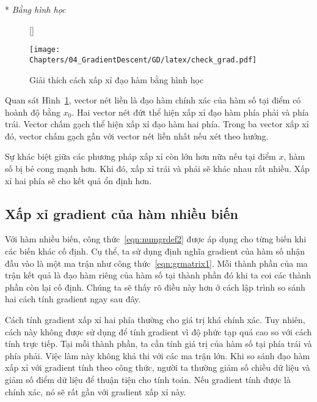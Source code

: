 \newpage
* \textit{Bằng hình học }

\begin{figure}[t]
[\FBwidth]
{\caption{
Giải thích cách xấp xỉ đạo hàm bằng hình học
}
\label{fig:explain_numgrad}}
{ %
\texttt{[image: Chapters/04\_GradientDescent/GD/latex/check\_grad.pdf]}
}
\end{figure}

Quan sát Hình~\ref{fig:explain_numgrad}, vector nét liền là đạo hàm {chính xác}
của hàm số tại điểm có hoành độ bằng $x_0$. Hai vector nét đứt thể hiện xấp xỉ
đạo hàm phía phải và phía trái. Vector chấm gạch thể hiện xấp xỉ đạo hàm hai
phía. Trong ba vector xấp xỉ đó, vector chấm gạch gần với vector nét liền nhất
nếu xét theo hướng.

Sự khác biệt giữa các phương pháp xấp xỉ còn lớn hơn nữa nếu tại điểm $x$, hàm số bị
{bẻ cong} mạnh hơn. Khi đó, xấp xỉ trái và phải sẽ khác nhau rất nhiều.
Xấp xỉ hai phía sẽ cho kết quả ổn định hơn.


\subsection{Xấp xỉ gradient của hàm nhiều biến}

Với hàm nhiều biến, công thức~\eqref{eqn:numgrdef2} được áp dụng cho từng biến
khi các biến khác cố định. Cụ thể, ta sử dụng định nghĩa gradient của hàm số nhận
đầu vào là một ma trận như công thức~\eqref{eqn:grmatrix1}. Mỗi thành phần của
ma trận kết quả là đạo hàm riêng của hàm số tại thành phần đó khi ta coi các thành
phần còn lại cố định. Chúng ta sẽ thấy rõ điều này hơn ở cách lập trình so sánh
hai cách tính gradient ngay sau đây.

Cách tính gradient xấp xỉ hai phía thường cho giá trị khá chính xác. Tuy nhiên,
cách này không được sử dụng để tính gradient vì độ phức tạp quá cao so với cách
tính trực tiếp. Tại mỗi thành phần, ta cần tính giá trị của hàm số tại phía trái
và phía phải. Việc làm này không khả thi với các ma trận lớn. Khi so sánh đạo
hàm xấp xỉ với gradient tính theo công thức, người ta thường giảm số chiều dữ
liệu và giảm số điểm dữ liệu để thuận tiện cho tính toán. Nếu gradient tính được
là chính xác, nó sẽ rất gần với gradient xấp xỉ này.

